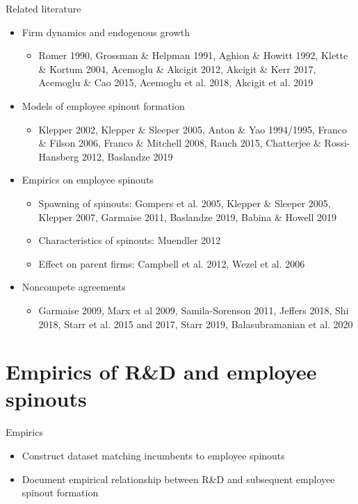 \documentclass[english,usenames,dvipsnames]{beamer}
\begin{document}
\begin{frame}{Related literature}
\footnotesize
\begin{itemize}
\item Firm dynamics and endogenous growth
\begin{itemize}
\scriptsize
\item Romer 1990, Grossman \& Helpman 1991, Aghion \& Howitt 1992, Klette \& Kortum 2004, Acemoglu \& Akcigit 2012, Akcigit \& Kerr 2017, Acemoglu \& Cao 2015, Acemoglu et al. 2018, Akcigit et al. 2019
\end{itemize}
\smallskip
\item Models of employee spinout formation
\begin{itemize}
\scriptsize
\item Klepper 2002, Klepper \& Sleeper 2005, Anton \& Yao 1994/1995, Franco \& Filson 2006, Franco \& Mitchell 2008, Rauch 2015, Chatterjee \& Rossi-Hansberg 2012, Baslandze 2019
\end{itemize}
\smallskip
\item Empirics on employee spinouts
\begin{itemize}
\scriptsize
\item Spawning of spinouts: Gompers et al. 2005, Klepper \& Sleeper 2005, Klepper 2007, Garmaise 2011, Baslandze 2019, Babina \& Howell 2019
\item Characteristics of spinouts: Muendler 2012
\item Effect on parent firms: Campbell et al. 2012, Wezel et al. 2006
\end{itemize}
\smallskip
\item Noncompete agreements
\begin{itemize}
	\scriptsize
	\item Garmaise 2009, Marx et al 2009, Samila-Sorenson 2011, Jeffers 2018, Shi 2018, Starr et al. 2015 and 2017, Starr 2019, Balasubramanian et al. 2020
\end{itemize}
\end{itemize}
\end{frame}

\section{Empirics of R\&D and employee spinouts}

\begin{frame}
	\tableofcontents[currentsection]
\end{frame}

\begin{frame}{Empirics}
	\begin{itemize}
		\item Construct dataset matching incumbents to employee spinouts
		\smallskip
		\item Document empirical relationship between R\&D and subsequent employee spinout formation
	\end{itemize}
\end{frame}
\end{document}
